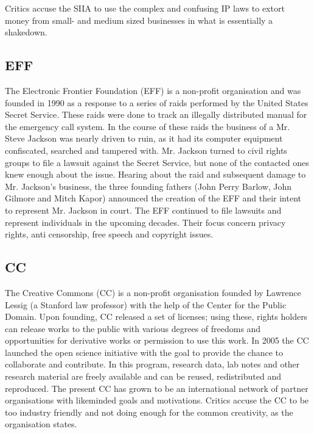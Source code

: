 \documentclass[a4paper]{report}
\begin{document}
Critics accuse the SIIA to use the complex and confusing IP laws to extort money from small- and medium sized businesses in what is essentially a shakedown. \parencite{Melymuka2006}

\subsection{EFF}
\label{sec:EFF}
The Electronic Frontier Foundation (EFF) is a non-profit organisation and was founded in 1990 as a response to a series of raids performed by the United States Secret Service. These raids were done to track an illegally distributed manual for the emergency call system. In the course of these raids the business of a Mr. Steve Jackson was nearly driven to ruin, as it had its computer equipment confiscated, searched and tampered with. Mr. Jackson turned to civil rights groups to file a lawsuit against the Secret Service, but none of the contacted ones knew enough about the issue. Hearing about the raid and subsequent damage to Mr. Jackson's business, the three founding fathers (John Perry Barlow, John Gilmore and Mitch Kapor) announced the creation of the EFF and their intent to represent Mr. Jackson in court.
The EFF continued to file lawsuits and represent individuals in the upcoming decades. Their focus concern privacy rights, anti censorship, free speech and copyright issues. \parencite{EFFhistory} \parencite{Schultz}

\subsection{CC}
\label{sec:CC}
The Creative Commons (CC) is a non-profit organisation founded by Lawrence Lessig (a Stanford law professor) with the help of the Center for the Public Domain. Upon founding, CC released a set of licenses; using these, rights holders can release works to the public with various degrees of freedoms and opportunities for derivative works or permission to use this work.
In 2005 the CC launched the open science initiative with the goal to provide the chance to collaborate and contribute. In this program, research data, lab notes and other research material are freely available and can be reused, redistributed and reproduced.
The present CC has grown to be an international network of partner organisations with likeminded goals and motivations. \parencite{Plotkin2002} \parencite{CC2016}
Critics accuse the CC to be too industry friendly and not doing enough for the common creativity, as the organisation states. \parencite{Berry2005}
\end{document}
